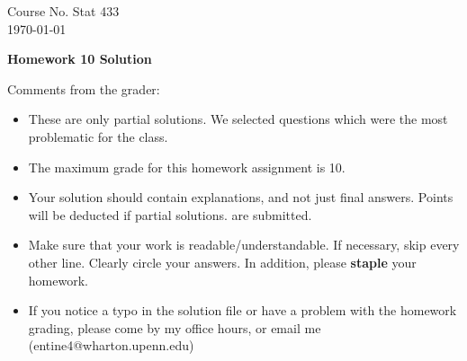 \documentclass[10pt,a4paper]{article}
\begin{document}
\begin{flushleft}
Course No. Stat 433 \\
\today
\end{flushleft}

\begin{center}
{\Large{\bf  Homework 10 Solution}}
\end{center}

\textcolor[rgb]{0.98,0.00,0.00}{Comments from the grader:}
\begin{itemize}
    \item \textcolor[rgb]{0.98,0.00,0.00}{These are only partial solutions.  We selected
    questions which were the most problematic for the class.}
    \item \textcolor[rgb]{0.98,0.00,0.00}{The maximum grade for this homework assignment is 10.}
    \item \textcolor[rgb]{0.98,0.00,0.00}{Your solution should contain explanations, and not just
    final answers. Points will be deducted if partial solutions.
    are submitted.}
    \item \textcolor[rgb]{0.98,0.00,0.00}{Make sure that your work is readable/understandable.  If necessary, skip every other line.  Clearly circle your answers.  In addition, please {\bf staple} your homework.}
    \item \textcolor[rgb]{0.98,0.00,0.00}{If you notice a typo in the solution file or have a problem with the homework
    grading, please come by my office hours, or email me (entine4@wharton.upenn.edu)}

\end{itemize}
\end{document}
